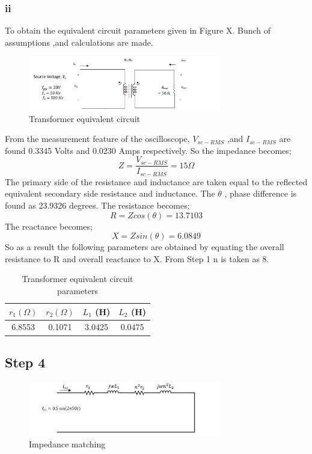 \documentclass[letterpaper,12pt]{article}
\begin{document}
\subsubsection{ii}
To obtain the equivalent circuit parameters given in Figure X. Bunch of assumptions ,and calculations are made.
\begin{figure}[H]
    \centering
    \includegraphics[width = 0.75\textwidth]{2.png}
    \caption{Transformer equivalent circuit}
\end{figure} 
From the measurement feature of the oscilloscope, \(V_{sc-RMS}\) ,and \(I_{sc-RMS}\) are found 0.3345 Volts and 0.0230 Amps respectively. So the impedance becomes;
\[
    Z = \frac{V_{sc-RMS}}{I_{sc-RMS}} = 15 \Omega
    \]
The primary side of the resistance and inductance are taken equal to the reflected equivalent secondary side resistance and inductance. The \(\theta\) , phase difference is found as 23.9326 degrees. The resistance becomes;
\[
    R = Z cos (\theta) = 13.7103
    \]
    The reactance becomes;
    \[
    X = Z sin (\theta) = 6.0849 
    \]
So as a result the following parameters are obtained by equating the overall resistance to R and overall reactance to X. From Step 1 n is taken as 8.
\begin{table}[H]
    \begin{center}
        \caption{Transformer equivalent circuit parameters}
        \vspace{2mm}
        \begin{tabular}{||c | c | c | c ||} 
            \hline
            \(r_1 (\Omega) \) & \(r_2 (\Omega)\)  & \(L_1\) (H) & \(L_2\) (H) \\ [0.5ex] 
            \hline\hline
            6.8553 & 0.1071 & 3.0425 & 0.0475 \\ 
            \hline
        \end{tabular}
    \end{center}
    \end{table}
    

\subsection{Step 4}
\begin{figure}[H]
    \centering
    \includegraphics[width = 0.75\textwidth]{3.png}
    \caption{Impedance matching}
\end{figure} 
\end{document}
